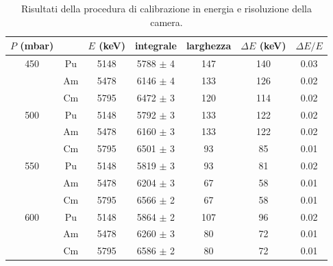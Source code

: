 \documentclass[italian,a4paper]{article}
\newcommand{\D}{\Delta}
\begin{document}
\begin{table}[h!]\centering
\renewcommand{\arraystretch}{1.1}
\begin{tabular}{*7c}
$P$ (mbar)& &	$E$ (keV)&	integrale&	larghezza &	$\D E$ (keV)& $\D E / E$\\\midrule[.15em]
450&	Pu&	5148&	    	5788 $\pm$ 4& 	147&		140&	0.03\\
&	Am&	5478&		6146 $\pm$ 4& 	133&		126&	0.02\\
&	Cm&	5795&		6472 $\pm$ 3&	120&		114&	0.02\\\hline
500&	Pu&	5148&	    	5792 $\pm$ 3&  	133& 		122& 	0.02\\
&	Am&	5478&		6160 $\pm$ 3&  	133& 		122& 	0.02\\
&	Cm&	5795&		6501 $\pm$ 3&  	93& 		85& 	0.01\\\hline
550&	Pu&	5148&	    	5819 $\pm$ 3&  	93& 		81& 	0.02\\
&	Am&	5478&		6204 $\pm$ 3&  	67& 		58& 	0.01\\
&	Cm&	5795&		6566 $\pm$ 2&  	67& 		58& 	0.01\\\hline
600&	Pu&	5148&	    	5864 $\pm$ 2&  	107& 		96& 	0.02\\
&	Am&	5478&		6260 $\pm$ 3&  	80& 		72& 	0.01\\
&	Cm&	5795&		6586 $\pm$ 2&  	80& 		72& 	0.01
\end{tabular}
\caption{Risultati della procedura di calibrazione in energia e risoluzione della camera.}
\end{table}\\
\end{document}
